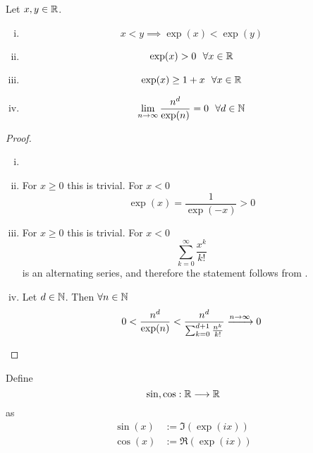 \documentclass[../../script.tex]{subfiles}
\begin{document}
\begin{thm}
Let $x, y \in \mathbb{R}$.
\begin{enumerate}[(i)]
	\item
	\[
		x < y \implies \exp(x) < \exp(y)
	\]
	
	\item
	\[
		\exp(x) > 0 ~~\forall x \in \mathbb{R}
	\]
	
	\item 
	\[
		\exp(x) \ge 1 + x ~~\forall x \in \mathbb{R}
	\]
	
	\item
	\[
		\lim_{n \rightarrow \infty} \frac{n^d}{\exp(n)} = 0 ~~\forall d \in \mathbb{N}
	\]
\end{enumerate}
\end{thm}
\begin{proof}\leavevmode
\begin{enumerate}[(i)]
	\item \reader
	
	\item For $x \ge 0$ this is trivial. For $x < 0$
	\begin{equation}
		\exp(x) = \frac{1}{\exp(-x)} > 0
	\end{equation}
	
	\item For $x \ge 0$ this is trivial. For $x < 0$
	\begin{equation}
		\sum_{k=0}^{\infty} \frac{x^k}{k!}
	\end{equation}
	is an alternating series, and therefore the statement follows from .
	
	\item Let $d \in \mathbb{N}$. Then $\forall n \in \mathbb{N}$
	\begin{equation}
		0 < \frac{n^d}{\exp(n)} < \frac{n^d}{\sum_{k=0}^{d+1} \frac{n^k}{k!}} \convinf 0
	\end{equation}
\end{enumerate}
\end{proof}

\begin{defi}
Define
\[
	\sin, \cos: \mathbb{R} \longrightarrow \mathbb{R}
\]
as
\begin{align*}
	\sin(x) &:= \Im(\exp(ix)) \\
	\cos(x) &:= \Re(\exp(ix))
\end{align*}
\end{defi}
\end{document}
